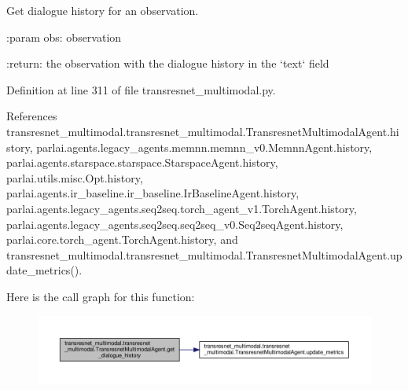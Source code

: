 \begin{DoxyVerb}Get dialogue history for an observation.

:param obs:
    observation

:return:
    the observation with the dialogue history in the `text` field
\end{DoxyVerb}
 

Definition at line 311 of file transresnet\+\_\+multimodal.\+py.



References transresnet\+\_\+multimodal.\+transresnet\+\_\+multimodal.\+Transresnet\+Multimodal\+Agent.\+history, parlai.\+agents.\+legacy\+\_\+agents.\+memnn.\+memnn\+\_\+v0.\+Memnn\+Agent.\+history, parlai.\+agents.\+starspace.\+starspace.\+Starspace\+Agent.\+history, parlai.\+utils.\+misc.\+Opt.\+history, parlai.\+agents.\+ir\+\_\+baseline.\+ir\+\_\+baseline.\+Ir\+Baseline\+Agent.\+history, parlai.\+agents.\+legacy\+\_\+agents.\+seq2seq.\+torch\+\_\+agent\+\_\+v1.\+Torch\+Agent.\+history, parlai.\+agents.\+legacy\+\_\+agents.\+seq2seq.\+seq2seq\+\_\+v0.\+Seq2seq\+Agent.\+history, parlai.\+core.\+torch\+\_\+agent.\+Torch\+Agent.\+history, and transresnet\+\_\+multimodal.\+transresnet\+\_\+multimodal.\+Transresnet\+Multimodal\+Agent.\+update\+\_\+metrics().

Here is the call graph for this function\+:
\nopagebreak
\begin{figure}[H]
\begin{center}
\leavevmode
\includegraphics[width=350pt]{classtransresnet__multimodal_1_1transresnet__multimodal_1_1TransresnetMultimodalAgent_a84b3d72c768687151e9a6b5461927034_cgraph}
\end{center}
\end{figure}
\mbox{\label{classtransresnet__multimodal_1_1transresnet__multimodal_1_1TransresnetMultimodalAgent_aca7bfd0e87f63ddd1a716b99efc85774}} 
